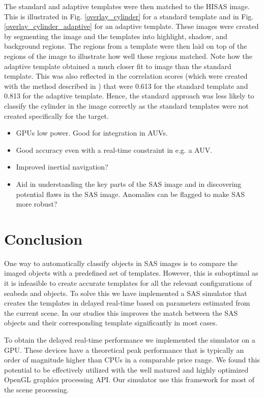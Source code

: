 \documentclass[10pt,journal,draftclsnofoot,onecolumn]{IEEEtran}
\newcommand\1{\vec 1}
\begin{document}
The standard and adaptive templates were then matched to the HISAS image. This is illustrated in Fig. \ref{overlay_cylinder} for a standard template and in Fig. \ref{overlay_cylinder_adaptive} for an adaptive template. These images were created by segmenting the image and the templates into highlight, shadow, and background regions. The regions from a template were then laid on top of the regions of the image to illustrate how well these regions matched. Note how the adaptive template obtained a much closer fit to image than the standard template. This was also reflected in the correlation scores (which were created with the method described in \cite{Midelfart2010}) that were 0.613 for the standard template and 0.813 for the adaptive template. Hence, the standard approach was less likely to classify the cylinder in the image correctly as the standard templates were not created specifically for the target.

\begin{itemize}
\item GPUs low power. Good for integration in AUVs.
\item Good accuracy even with a real-time constraint in e.g. a AUV.
\item Improved inertial navigation?
\item Aid in understanding the key parts of the SAS image and in discovering potential flaws in the SAS image. Anomalies can be flagged to make SAS more robust?
\end{itemize}


\section{Conclusion}\label{conclusion}

One way to automatically classify objects in SAS images is to compare the imaged objects with a predefined set of templates. However, this is suboptimal as it is infeasible to create accurate templates for all the relevant configurations of seabeds and objects. To solve this we have implemented a SAS simulator that creates the templates in delayed real-time based on parameters estimated from the current scene. In our studies this improves the match between the SAS objects and their corresponding template significantly in most cases.

To obtain the delayed real-time performance we implemented the simulator on a GPU. These devices have a theoretical peak performance that is typically an order of magnitude higher than CPUs in a comparable price range. We found this potential to be effectively utilized with the well matured and highly optimized OpenGL graphics processing API. Our simulator use this framework for most of the scene processing.
\end{document}
